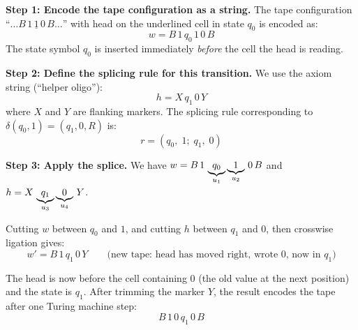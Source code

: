 \begin{example}
\textbf{Step 1: Encode the tape configuration as a string.}
The tape configuration ``$\ldots B\, 1\, \underline{1}\, 0\, B \ldots$'' with head on the underlined cell in state $q_0$ is encoded as:
\[
w = B\, 1\, q_0\, 1\, 0\, B
\]
The state symbol $q_0$ is inserted immediately \emph{before} the cell the head is reading.

\textbf{Step 2: Define the splicing rule for this transition.}
We use the axiom string (``helper oligo''):
\[
h = X\, q_1\, 0\, Y
\]
where $X$ and $Y$ are flanking markers. The splicing rule corresponding to $\delta(q_0, 1) = (q_1, 0, R)$ is:
\[
r = (q_0,\; 1;\; q_1,\; 0)
\]

\textbf{Step 3: Apply the splice.}
We have $w = B\, 1\, \underbrace{q_0}_{\mathclap{u_1}} \underbrace{1}_{\mathclap{u_2}}\, 0\, B$ and $h = X\, \underbrace{q_1}_{\mathclap{u_3}} \underbrace{0}_{\mathclap{u_4}}\, Y$.

Cutting $w$ between $q_0$ and $1$, and cutting $h$ between $q_1$ and $0$, then crosswise ligation gives:
\[
w' = B\, 1\, q_1\, 0\, Y \qquad \text{(new tape: head has moved right, wrote 0, now in } q_1 \text{)}
\]

The head is now before the cell containing $0$ (the old value at the next position) and the state is $q_1$. After trimming the marker $Y$, the result encodes the tape after one Turing machine step:
\[
B\, 1\, 0\, q_1\, 0\, B
\]
\end{example}

